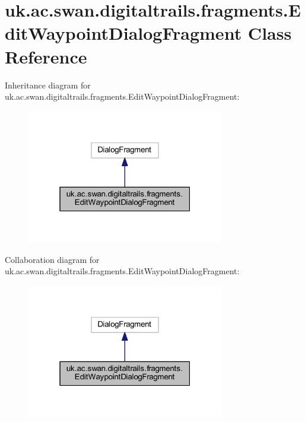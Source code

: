 \hypertarget{classuk_1_1ac_1_1swan_1_1digitaltrails_1_1fragments_1_1_edit_waypoint_dialog_fragment}{\section{uk.\+ac.\+swan.\+digitaltrails.\+fragments.\+Edit\+Waypoint\+Dialog\+Fragment Class Reference}
\label{classuk_1_1ac_1_1swan_1_1digitaltrails_1_1fragments_1_1_edit_waypoint_dialog_fragment}
}


Inheritance diagram for uk.\+ac.\+swan.\+digitaltrails.\+fragments.\+Edit\+Waypoint\+Dialog\+Fragment\+:\nopagebreak
\begin{figure}[H]
\begin{center}
\leavevmode
\includegraphics[width=244pt]{classuk_1_1ac_1_1swan_1_1digitaltrails_1_1fragments_1_1_edit_waypoint_dialog_fragment__inherit__graph}
\end{center}
\end{figure}


Collaboration diagram for uk.\+ac.\+swan.\+digitaltrails.\+fragments.\+Edit\+Waypoint\+Dialog\+Fragment\+:\nopagebreak
\begin{figure}[H]
\begin{center}
\leavevmode
\includegraphics[width=244pt]{classuk_1_1ac_1_1swan_1_1digitaltrails_1_1fragments_1_1_edit_waypoint_dialog_fragment__coll__graph}
\end{center}
\end{figure}
